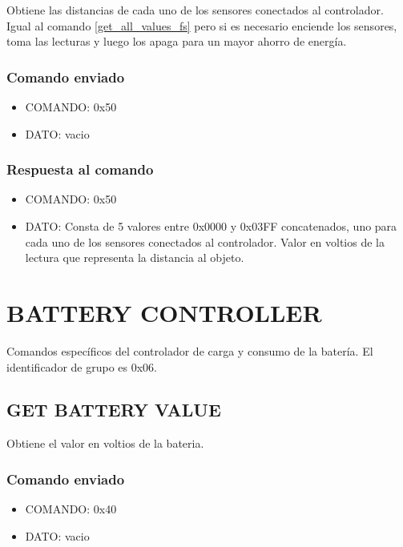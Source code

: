 \documentclass[a4paper,10pt]{article}
\begin{document}
Obtiene las distancias de cada uno de los sensores conectados al controlador.
Igual al comando \ref{get_all_values_fs} pero si es necesario enciende los sensores, toma las lecturas y luego los apaga para un mayor ahorro de energ\'ia.

\subsubsection*{Comando enviado}

\begin{itemize}
	\item{COMANDO:} 0x50
	\item{DATO:} vacio
\end{itemize}

\subsubsection*{Respuesta al comando}

\begin{itemize}
	\item{COMANDO:} 0x50
	\item{DATO:} Consta de 5 valores entre 0x0000 y 0x03FF concatenados, uno para cada uno de los sensores conectados al controlador.
	Valor en voltios de la lectura que representa la distancia al objeto.
\end{itemize}

\section{BATTERY CONTROLLER} 
\label{grupo_battery_controller}

Comandos espec\'ificos del controlador de carga y consumo de la bater\'ia.
El identificador de grupo es 0x06.

\subsection{GET BATTERY VALUE}
\label{get_battery_value}

Obtiene el valor en voltios de la bateria.

\subsubsection*{Comando enviado}

\begin{itemize}
	\item{COMANDO:} 0x40
	\item{DATO:} vacio
\end{itemize}
\end{document}
